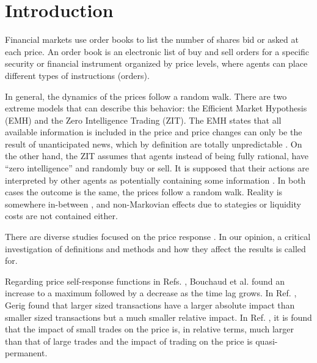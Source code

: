 \section{Introduction}\label{sec:introduction}

Financial markets use order books to list the number of shares bid or asked at
each price. An order book is an electronic list of buy and sell orders for a
specific security or financial instrument organized by price levels, where
agents can place different types of instructions (orders).

In general, the dynamics of the prices follow a random walk. There are two
extreme models that can describe this behavior: the Efficient Market Hypothesis
(EMH) and the Zero Intelligence Trading (ZIT). The EMH states that all
available information is included in the price and price changes can only be
the result of unanticipated news, which by definition are totally unpredictable
\cite{subtle_nature,Bouchaud_2004,EMH_lillo,stat_theory}. On the other hand,
the ZIT assumes that agents instead of being fully rational, have ``zero
intelligence” and randomly buy or sell. It is supposed that their actions are
interpreted by other agents as potentially containing some information
\cite{subtle_nature,Bouchaud_2004,stat_theory,Wang_2016_cross}.
In both cases the outcome is the same, the prices follow a random walk. Reality
is somewhere in-between \cite{Bouchaud_2004,stat_theory}, and non-Markovian
effects due to stategies or liquidity costs are not contained either.

There are diverse studies focused on the price response
\cite{prop_order_book,dissecting_cross,r_walks_liquidity,subtle_nature,Bouchaud_2004,large_prices_changes,pow_law_dist,theory_market_impact,spread_changes_affect,master_curve,EMH_lillo,quant_stock_price_response,ori_pow_law,Wang_2018_b,Wang_2018_a,Wang_2016_avg,Wang_2016_cross}.
In our opinion, a critical investigation of definitions and methods and how
they affect the results is called for.

Regarding price self-response functions in Refs.
\cite{r_walks_liquidity,subtle_nature,Bouchaud_2004}, Bouchaud et al. found an
increase to a maximum followed by a decrease as the time lag grows.
In Ref. \cite{theory_market_impact}, Gerig found that larger sized transactions
have a larger absolute impact than smaller sized transactions but a much
smaller relative impact. In Ref. \cite{prop_order_book}, it is found that the
impact of small trades on the price is, in relative terms, much larger than
that of large trades and the impact of trading on the price is quasi-permanent.

